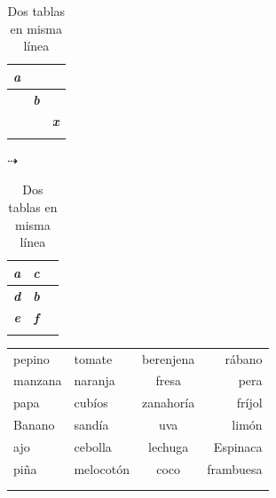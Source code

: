 \documentclass[journal, spanish]{IEEEtran}
\begin{document}
 \begin{table}[h]
   \centering
   \begin{tabular}{ c |  c | c }
    \textbf{\textit{a}} &    & \\ \hline
    & \textbf{\textit{b}} & \\ \hline
    &  & \textbf{\textit{x}} \\ \hline
    &    &  \\
   \end{tabular}%
 \quad$ \dashrightarrow $\quad
    \begin{tabular}{ c |  c | c }
     \textbf{\textit{a}} &\textbf{\textit{ c}}  & \\ \hline
     \textbf{\textit{d}} & \textbf{\textit{b}}  & \\ \hline
     \textbf{\textit{e}} & \textbf{\textit{f}}  & \\ \hline
     &    &  \\
    \end{tabular}
    \caption{Dos tablas en misma línea}
 \end{table}
 \begin{center}
    \begin{tabular}{llcr}
    pepino & tomate & berenjena & rábano \\
    manzana & naranja & fresa & pera \\
    papa & cubíos & zanahoría & fríjol \\
    Banano & sandía & uva & limón \\
    ajo & cebolla & lechuga & Espinaca \\
    piña & melocotón & coco & frambuesa \\\\\\
    \end{tabular}
\end{center}
\end{document}

